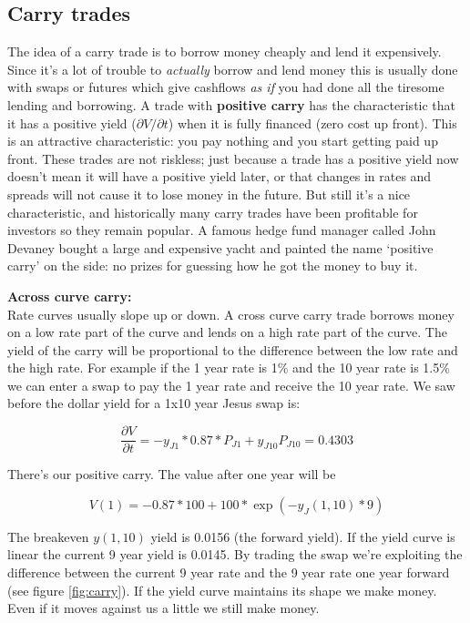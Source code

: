 \subsection{Carry trades}
The idea of a carry trade is to borrow money cheaply and lend it expensively. Since it's a lot of trouble to \textit{actually} borrow and lend money this is usually done with swaps or futures which give cashflows \textit{as if} you had done all the tiresome lending and borrowing. A trade with \textbf{positive carry} has the characteristic that it has a positive yield ($\partial V/\partial t$) when it is fully financed (zero cost up front). This is an attractive characteristic: you pay nothing and you start getting paid up front. These trades are not riskless; just because a trade has a positive yield now doesn't mean it will have a positive yield later, or that changes in rates and spreads will not cause it to lose money in the future. But still it's a nice characteristic, and historically many carry trades have been profitable for investors so they remain popular. A famous hedge fund manager called John Devaney bought a large and expensive yacht and painted the name `positive carry' on the side: no prizes for guessing how he got the money to buy it.

\textbf{Across curve carry:}\\

Rate curves usually slope up or down. A cross curve carry trade borrows money on a low rate part of the curve and lends on a high rate part of the curve. The yield of the carry will be proportional to the difference between the low rate and the high rate. For example if the 1 year rate is 1\% and the 10 year rate is 1.5\% we can enter a swap to pay the 1 year rate and receive the 10 year rate. We saw before the dollar yield for a 1x10 year Jesus swap is:

\[\frac{\partial V}{\partial t} = -y_{J1}*0.87*P_{J1}+y_{J10}P_{J10} = 0.4303  \]

There's our positive carry. The value after one year will be

\[V(1) = -0.87*100+100*\exp(-y_J(1,10)*9) \]

The breakeven $y(1,10) $ yield is 0.0156 (the forward yield). If the yield curve is linear the current 9 year yield is 0.0145. By trading the swap we're exploiting the difference between the current 9 year rate and the 9 year rate one year forward (see figure \ref{fig:carry}). If the yield curve maintains its shape we make money. Even if it moves against us a little we still make money.

